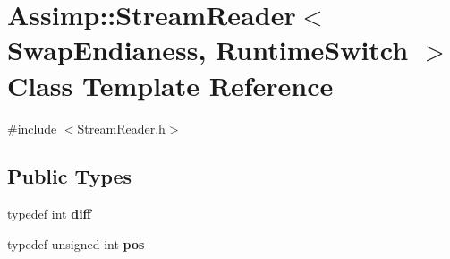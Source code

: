 \hypertarget{singleton_assimp_1_1_stream_reader}{\section{Assimp\+:\+:Stream\+Reader$<$ Swap\+Endianess, Runtime\+Switch $>$ Class Template Reference}
\label{singleton_assimp_1_1_stream_reader}
}


{\ttfamily \#include $<$Stream\+Reader.\+h$>$}

\subsection*{Public Types}
\begin{DoxyCompactItemize}
\item 
\hypertarget{singleton_assimp_1_1_stream_reader_aef83cd800c56109ce5a46b73c557290e}{typedef int {\bfseries diff}}\label{singleton_assimp_1_1_stream_reader_aef83cd800c56109ce5a46b73c557290e}

\item 
\hypertarget{singleton_assimp_1_1_stream_reader_ada529c97802794c0b7eedebc20435f80}{typedef unsigned int {\bfseries pos}}\label{singleton_assimp_1_1_stream_reader_ada529c97802794c0b7eedebc20435f80}

\end{DoxyCompactItemize}
